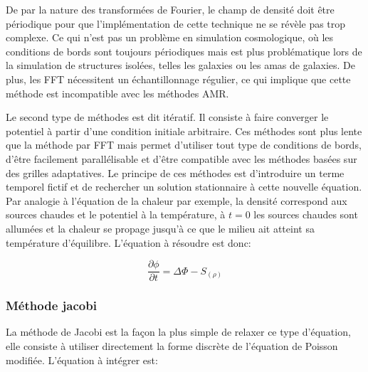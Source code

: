 De par la nature des transformées de Fourier, le champ de densité doit être périodique pour que l'implémentation de cette technique ne se révèle pas trop complexe. 
Ce qui n'est pas un problème en simulation cosmologique, où les conditions de bords sont toujours périodiques mais est plus problématique lors de la simulation de structures isolées, telles les galaxies ou les amas de galaxies. 
De plus, les FFT nécessitent un échantillonnage régulier, ce qui implique que cette méthode est incompatible avec les méthodes \ac{AMR}. 

Le second type de méthodes est dit itératif. 
Il consiste à faire converger le potentiel à partir d'une condition initiale arbitraire. 
Ces méthodes sont plus lente que la méthode par FFT mais permet d'utiliser tout type de conditions de bords, d'être facilement parallélisable et d'être compatible avec les méthodes basées sur des grilles adaptatives.
Le principe de ces méthodes est d'introduire un terme temporel fictif et de rechercher un solution stationnaire à cette nouvelle équation.
Par analogie à l'équation de la chaleur par exemple, la densité correspond aux sources chaudes et le potentiel à la température, à $t=0$ les sources chaudes sont allumées et la chaleur se propage jusqu'à ce que le milieu ait atteint sa température d'équilibre. 
L'équation à résoudre est donc:

\begin{equation}
\dfrac{\partial \phi}{\partial t} = \Delta \Phi -S_{(\rho)}
\end{equation}



\subsubsection{Méthode jacobi}

La méthode de Jacobi est la façon la plus simple de relaxer ce type d'équation, elle consiste à utiliser directement la forme discrète de l'équation de Poisson modifiée. 
L'équation à intégrer est:

